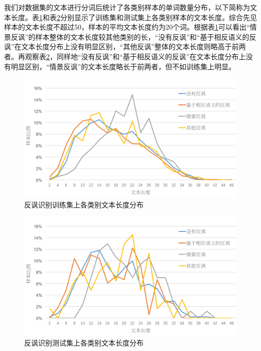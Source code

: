 我们对数据集的文本进行分词后统计了各类别样本的单词数量分布，以下简称为文本长度。表\ref{fig:semeval2018_task3_train_class_len}和表\ref{fig:semeval2018_task3_test_class_len}分别显示了训练集和测试集上各类别样本的文本长度。综合先见样本的文本长度不超过50，样本的平均文本长度约为20个词。根据表\ref{fig:semeval2018_task3_train_class_len}可以看出“情景反讽”的样本整体的文本长度较其他类别的长，“没有反讽”和“基于相反语义的反讽”在文本长度分布上没有明显区别，“其他反讽”整体的文本长度则略高于前两者。再观察表\ref{fig:semeval2018_task3_test_class_len}，同样地“没有反讽”和“基于相反语义的反讽”在文本长度分布上没有明显区别，“情景反讽”的文本长度略长于前两者，但不如训练集上明显。

\begin{figure}[H]
  \centering
  \includegraphics[width=\textwidth]{img/semeval2018_task3_train_class_len.png}
  \caption{反讽识别训练集上各类别文本长度分布}
  \label{fig:semeval2018_task3_train_class_len}
\end{figure}

\begin{figure}[H]
  \centering
  \includegraphics[width=\textwidth]{img/semeval2018_task3_test_class_len.png}
  \caption{反讽识别测试集上各类别文本长度分布}
  \label{fig:semeval2018_task3_test_class_len}
\end{figure}

